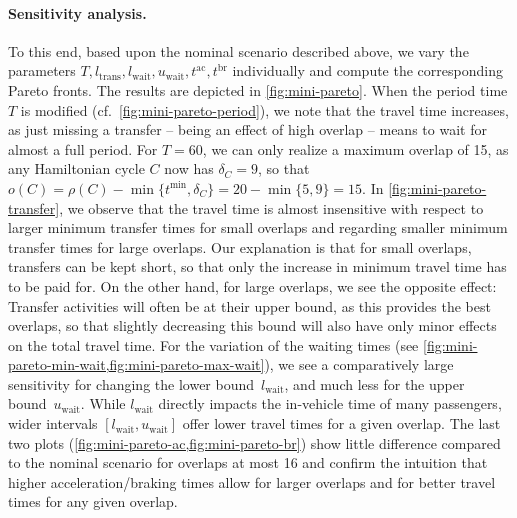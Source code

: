 \documentclass[11pt,a4paper]{article}
\newcommand{\wait}{\mathrm{wait}}
\newcommand{\transfer}{\mathrm{trans}}
\newcommand{\ac}{\mathrm{ac}}
\newcommand{\br}{\mathrm{br}}
\theoremstyle{definition}
\theoremstyle{remark}
\begin{document}
\paragraph{Sensitivity analysis.}
To this end, based upon the nominal scenario described above, we vary the parameters $T, l_\transfer, l_\wait, u_\wait, t^\ac, t^\br$ individually and compute the corresponding Pareto fronts. The results are depicted in \cref{fig:mini-pareto}. When the period time $T$ is modified (cf.\ \cref{fig:mini-pareto-period}), we note that the travel time increases, as just missing a transfer -- being an effect of high overlap -- means to wait for almost a full period. For $T = 60$, we can only realize a maximum overlap of 15, as any Hamiltonian cycle $C$ now has $\delta_C = 9$, so that $o(C) = \rho(C) - \min\{t^{\min}, \delta_C\} = 20 - \min\{5, 9\} = 15$. In \cref{fig:mini-pareto-transfer}, we observe that the travel time is almost insensitive with respect to larger minimum transfer times for small overlaps and regarding smaller minimum transfer times for large overlaps. Our explanation is that for small overlaps, transfers can be kept short, so that only the increase in minimum travel time has to be paid for. On the other hand, for large overlaps, we see the opposite effect: Transfer activities will often be at their upper bound, as this provides the best overlaps, so that slightly decreasing this bound will also have only minor effects on the total travel time. For the variation of the waiting times (see \cref{fig:mini-pareto-min-wait,fig:mini-pareto-max-wait}), we see a comparatively large sensitivity for changing the lower bound~$l_\wait$, and much less for the upper bound~$u_\wait$. While $l_\wait$ directly impacts the in-vehicle time of many passengers, wider intervals $[l_\wait, u_\wait]$ offer lower travel times for a given overlap. The last two plots (\cref{fig:mini-pareto-ac,fig:mini-pareto-br}) show little difference compared to the nominal scenario for overlaps at most 16 and confirm the intuition that higher acceleration/braking times allow for larger overlaps and for better travel times for any given overlap.
\end{document}
